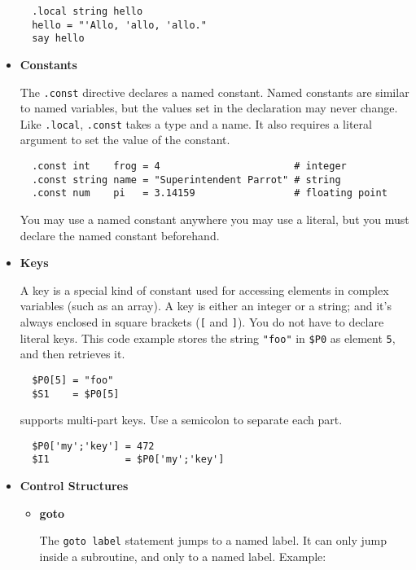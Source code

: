 \begin{itemize}
\begin{verbatim}
  .local string hello
  hello = "'Allo, 'allo, 'allo."
  say hello
\end{verbatim}

\item {\bf Constants }

The \verb|.const| directive declares a named constant. Named constants are
similar to named variables, but the values set in the declaration
may never change. Like \verb|.local|, \verb|.const| takes a type and a name. It
also requires a literal argument to set the value of the constant.

\begin{verbatim}
  .const int    frog = 4                       # integer
  .const string name = "Superintendent Parrot" # string
  .const num    pi   = 3.14159                 # floating point
\end{verbatim}

You may use a named constant anywhere you may use a literal, but
you must declare the named constant beforehand. 

\item {\bf Keys }

A key is a special kind of constant used for accessing elements in
complex variables (such as an array). A key is either an integer
or a string; and it's always enclosed in square brackets 
(\verb|[| and \verb|]|).
You do not have to declare literal keys. This code example stores
the string \verb|"foo"|
in \verb|$P0| as element \verb|5|, and then retrieves it.

\begin{verbatim}
  $P0[5] = "foo"
  $S1    = $P0[5]
\end{verbatim}

 supports multi-part keys. Use a semicolon to separate each part.

\begin{verbatim}
  $P0['my';'key'] = 472
  $I1             = $P0['my';'key']
\end{verbatim}

\item {\bf Control Structures }

\begin{itemize}
\item {\bf goto}

The \verb|goto label| statement 
jumps to a named label. It can only
jump inside a subroutine, and only to a named label. 
Example:


\end{itemize}
\end{itemize}
